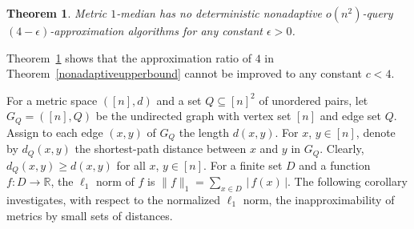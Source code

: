\documentclass[letterpaper,12pt]{article}
\newtheorem{theorem}{Theorem}
\newcommand{\comment}[1]{}
\begin{document}
{\begin{theorem}\label{maintheorem}
{\sc Metric $1$-median} has no deterministic nonadaptive $o(n^2)$-query
$(4-\epsilon)$-approximation
algorithms
for any constant $\epsilon>0$.
\end{theorem}



Theorem~\ref{maintheorem}
shows that
the approximation ratio of $4$ in
Theorem~\ref{nonadaptiveupperbound} cannot be improved to any constant
$c<4$.

\comment{For all $y\in[n]\setminus B$ with $(\hat{z},y)\notin Q$,
\begin{eqnarray}
d\left(\hat{z},y\right)\equiv\left\{
\begin{array}[ll]
3,& \text{if }y=z\text{ and } z\notin B;\\
1, &\text{otherwise}.
\end{array}
\right.
\label{distancesofnearoptimalpoint}
\end{eqnarray}
Clearly, this
and Eq.~(\ref{distancesonquerysetandbadvertices}) uniquely determines
$d(\hat{z},y)$ for all $y\in [n]$.

To complete specifying $d$,
for all $(x,y)\in [n]^2\setminus Q$ with $x\notin B$, $y\notin B$
\begin{eqnarray}
d(x,y)\equiv\left\{
\begin{array}[ll]
4,& \text{if }x=z \text{ or }y=z;\\
2,& \text{otherwise}.
\end{array}
\right.
\end{eqnarray}
}


For a metric space $([n],d)$ and a set $Q\subseteq [n]^2$
of unordered pairs,
let $G_Q=([n],Q)$ be the
undirected graph with
vertex set $[n]$ and
edge set $Q$.
Assign to each edge
$(x,y)$ of $G_Q$
the
length $d(x,y)$.
For $x$, $y\in[n]$, denote by $d_Q(x,y)$ the
shortest-path distance between $x$ and $y$ in $G_Q$.
Clearly, $d_Q(x,y)\ge d(x,y)$ for all $x$, $y\in[n]$.
For a finite set $D$ and a function $f\colon D\to \mathbb{R}$,
the $\ell_1$ norm of
$f$
is $\lVert f\rVert_1=\sum_{x\in D}\,|\,f(x)\,|$.
The following corollary investigates, with respect to the normalized
$\ell_1$ norm, the
inapproximability of
metrics
by small sets of distances.

}
\end{document}
